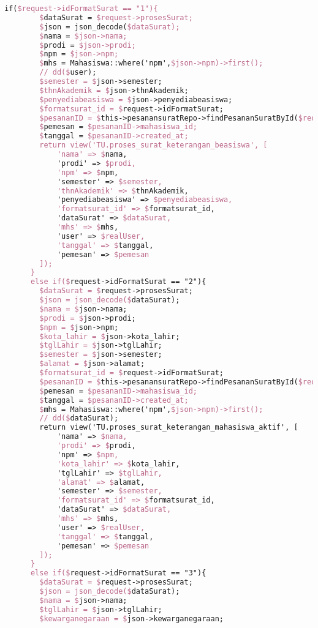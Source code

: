\begin{lstlisting}[language=tex,basicstyle=\tiny,caption=PesanansuratController.php]
      if($request->idFormatSurat == "1"){
        $dataSurat = $request->prosesSurat;
        $json = json_decode($dataSurat);
        $nama = $json->nama;
        $prodi = $json->prodi;
        $npm = $json->npm;
        $mhs = Mahasiswa::where('npm',$json->npm)->first();
        // dd($user);
        $semester = $json->semester;
        $thnAkademik = $json->thnAkademik;
        $penyediabeasiswa = $json->penyediabeasiswa;
        $formatsurat_id = $request->idFormatSurat;
        $pesananID = $this->pesanansuratRepo->findPesananSuratById($request->id);
        $pemesan = $pesananID->mahasiswa_id;
        $tanggal = $pesananID->created_at;
        return view('TU.proses_surat_keterangan_beasiswa', [
            'nama' => $nama,
            'prodi' => $prodi,
            'npm' => $npm,
            'semester' => $semester,
            'thnAkademik' => $thnAkademik,
            'penyediabeasiswa' => $penyediabeasiswa,
            'formatsurat_id' => $formatsurat_id,
            'dataSurat' => $dataSurat,
            'mhs' => $mhs,
            'user' => $realUser,
            'tanggal' => $tanggal,
            'pemesan' => $pemesan
        ]);
      }
      else if($request->idFormatSurat == "2"){
        $dataSurat = $request->prosesSurat;
        $json = json_decode($dataSurat);
        $nama = $json->nama;
        $prodi = $json->prodi;
        $npm = $json->npm;
        $kota_lahir = $json->kota_lahir;
        $tglLahir = $json->tglLahir;
        $semester = $json->semester;
        $alamat = $json->alamat;
        $formatsurat_id = $request->idFormatSurat;
        $pesananID = $this->pesanansuratRepo->findPesananSuratById($request->id);
        $pemesan = $pesananID->mahasiswa_id;
        $tanggal = $pesananID->created_at;
        $mhs = Mahasiswa::where('npm',$json->npm)->first();
        // dd($dataSurat);
        return view('TU.proses_surat_keterangan_mahasiswa_aktif', [
            'nama' => $nama,
            'prodi' => $prodi,
            'npm' => $npm,
            'kota_lahir' => $kota_lahir,
            'tglLahir' => $tglLahir,
            'alamat' => $alamat,
            'semester' => $semester,
            'formatsurat_id' => $formatsurat_id,
            'dataSurat' => $dataSurat,
            'mhs' => $mhs,
            'user' => $realUser,
            'tanggal' => $tanggal,
            'pemesan' => $pemesan
        ]);
      }
      else if($request->idFormatSurat == "3"){
        $dataSurat = $request->prosesSurat;
        $json = json_decode($dataSurat);
        $nama = $json->nama;
        $tglLahir = $json->tglLahir;
        $kewarganegaraan = $json->kewarganegaraan;

\end{lstlisting}
